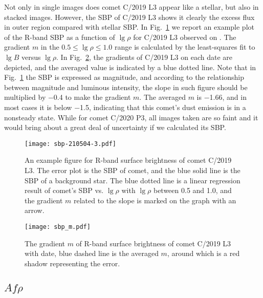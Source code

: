 Not only in single images does comet C/2019 L3 appear like a stellar, but also in stacked images. However, the SBP of C/2019 L3 shows it clearly the excess flux in outer region compared with stellar SBP. In Fig.~\ref{fig:sbp} we report an example plot of the R-band SBP as a function of $\lg{\rho}$ for C/2019 L3 observed on . The gradient $m$ in the $0.5 \leqslant \lg{\rho} \leqslant 1.0$ range is calculated by the least-squares fit to $\lg{B}$ versus $\lg{\rho}$. 
In Fig.~\ref{fig:sbp_m}, the gradients of C/2019 L3 on each date are depicted, and the averaged value is indicated by a blue dotted line. 
Note that in Fig.~\ref{fig:sbp} the SBP is expressed as magnitude, and according to the relationship between magnitude and luminous intensity, the slope in such figure should be multiplied by \num{-0.4} to make the gradient $m$. The averaged $m$ is \num{-1.66}, and in most cases it is below \num{-1.5}, indicating that this comet's dust emission is in a nonsteady state. While for comet C/2020 P3, all images taken are so faint and it would bring about a great deal of uncertainty if we calculated its SBP. 

\begin{figure}
    \centering
    \texttt{[image: sbp-210504-3.pdf]}
    \caption{An example figure for R-band surface brightness of comet C/2019 L3. The error plot is the SBP of comet, and the blue solid line is the SBP of a background star. The blue dotted line is a linear regression result of comet's SBP vs. $\lg{\rho}$ with $\lg{\rho}$ between 0.5 and 1.0, and the gradient $m$ related to the slope is marked on the graph with an arrow. }
    \label{fig:sbp}
\end{figure}

\begin{figure}
    \centering
    \texttt{[image: sbp\_m.pdf]}
    \caption{The gradient $m$ of R-band surface brightness of comet C/2019 L3 with date, blue dashed line is the averaged $m$, around which is a red shadow representing the error. }
    \label{fig:sbp_m}
\end{figure}


\subsection{$Af\rho$}

